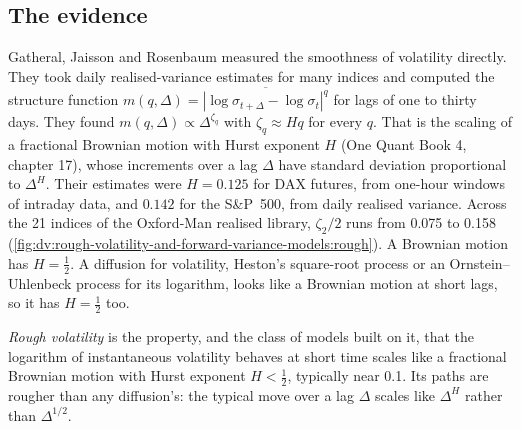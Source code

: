 \subsection{The evidence}

Gatheral, Jaisson and Rosenbaum measured the smoothness of volatility directly. They took daily
realised-variance estimates for many indices and computed the structure function
$m(q,\Delta)=\overline{|\log\sigma_{t+\Delta}-\log\sigma_t|^q}$ for lags of one to thirty days. They found
$m(q,\Delta)\propto\Delta^{\zeta_q}$ with $\zeta_q\approx Hq$ for every $q$. That is the scaling of a
fractional Brownian motion with Hurst exponent $H$ (One Quant Book 4, chapter 17), whose increments over a
lag $\Delta$ have standard deviation proportional to $\Delta^H$. Their estimates were $H=0.125$ for DAX futures, from one-hour windows of intraday data, and $0.142$ for the
S\&P~500, from daily realised variance. Across the 21 indices of the Oxford-Man realised
library, $\zeta_2/2$ runs from 0.075 to 0.158 (\cref{fig:dv:rough-volatility-and-forward-variance-models:rough}).
A Brownian motion has $H=\frac12$. A diffusion for volatility, Heston's square-root process or an
Ornstein--Uhlenbeck process for its logarithm, looks like a Brownian motion at short lags, so it has $H=\frac12$
too.

\begin{definition}\label{def:dv:rough-volatility-and-forward-variance-models:rough}
\emph{Rough volatility} is the property, and the class of models built on it, that the
logarithm of instantaneous volatility behaves at short time scales like a fractional Brownian motion with
Hurst exponent $H<\frac12$, typically near 0.1. Its paths are rougher than any diffusion's: the typical move
over a lag $\Delta$ scales like $\Delta^H$ rather than $\Delta^{1/2}$.
\end{definition}

